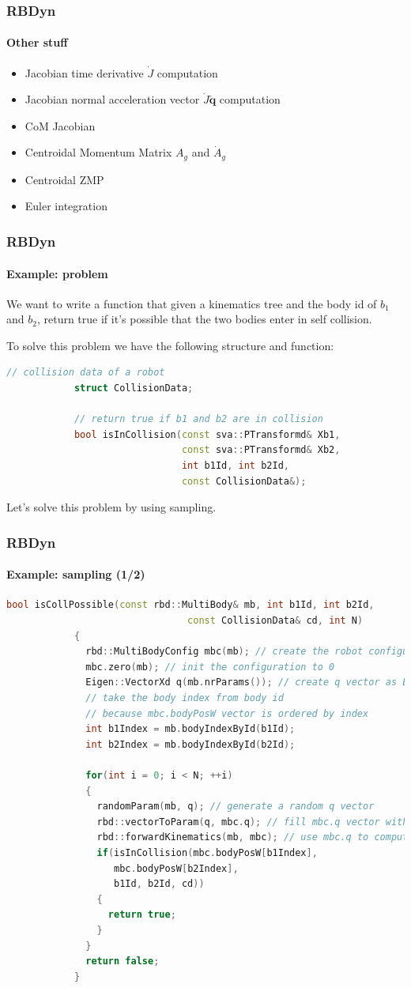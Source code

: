 \documentclass{beamer}
\begin{document}
	\begin{frame}
		\frametitle{RBDyn}
		\framesubtitle{Other stuff}
		\begin{itemize}
			\item Jacobian time derivative $ \dot{J} $ computation
			\item Jacobian normal acceleration vector $ \dot{J}\dot{\mathbf{q}} $ computation
			\item CoM Jacobian
			\item Centroidal Momentum Matrix $ A_g $ and $ \dot{A}_g $
			\item Centroidal ZMP
			\item Euler integration
		\end{itemize}
	\end{frame}

	\begin{frame}[fragile]
		\frametitle{RBDyn}
		\framesubtitle{Example: problem}
		We want to write a function that given a kinematics tree
		and the body id of $ b_1 $ and $ b_2 $, return true if it's possible that the two bodies enter in self collision.
		\\ \hfill

		To solve this problem we have the following structure and function:
		\begin{lstlisting}[language=C++]
			// collision data of a robot
			struct CollisionData;

			// return true if b1 and b2 are in collision
			bool isInCollision(const sva::PTransformd& Xb1,
			                   const sva::PTransformd& Xb2,
			                   int b1Id, int b2Id,
			                   const CollisionData&);
		\end{lstlisting}
		
		Let's solve this problem by using sampling.
	\end{frame}
	\begin{frame}[fragile]
		\frametitle{RBDyn}
		\framesubtitle{Example: sampling (1/2)}
		\begin{lstlisting}[language=C++,basicstyle=\tiny]
			bool isCollPossible(const rbd::MultiBody& mb, int b1Id, int b2Id,
			                    const CollisionData& cd, int N)
			{
			  rbd::MultiBodyConfig mbc(mb); // create the robot configuration
			  mbc.zero(mb); // init the configuration to 0
			  Eigen::VectorXd q(mb.nrParams()); // create q vector as Eigen3 vector
			  // take the body index from body id
			  // because mbc.bodyPosW vector is ordered by index
			  int b1Index = mb.bodyIndexById(b1Id);
			  int b2Index = mb.bodyIndexById(b2Id);

			  for(int i = 0; i < N; ++i)
			  {
			    randomParam(mb, q); // generate a random q vector
			    rbd::vectorToParam(q, mbc.q); // fill mbc.q vector with q
			    rbd::forwardKinematics(mb, mbc); // use mbc.q to compute mbc.bodyPosW
			    if(isInCollision(mbc.bodyPosW[b1Index],
			       mbc.bodyPosW[b2Index],
			       b1Id, b2Id, cd))
			    {
			      return true;
			    }
			  }
			  return false;
			}
		\end{lstlisting}
	\end{frame}
\end{document}
